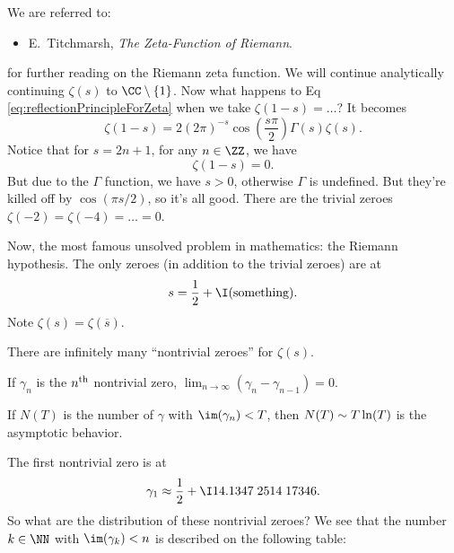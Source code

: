 
We are referred to:
\begin{itemize}
\item E.\ Titchmarsh,\newblock
\emph{The Zeta-Function of Riemann}.
\end{itemize}
for further reading on the Riemann zeta function. We will
continue analytically continuing $\zeta(s)$ to
$\CC\setminus\{1\}$. Now what happens to Eq
\eqref{eq:reflectionPrincipleForZeta} when we take
$\zeta(1-s)=\dots$?
It becomes
\begin{equation}
\zeta(1-s)=2(2\pi)^{-s}\cos\left(\frac{s\pi}{2}\right)\Gamma(s)\zeta(s).
\end{equation}
Notice that for $s=2n+1$, for any $n\in\ZZ$, we have
\begin{equation}
\zeta(1-s)=0.
\end{equation}
But due to the $\Gamma$ function, we have $s>0$, otherwise
$\Gamma$ is undefined. But they're killed off by $\cos(\pi s/2)$,
so it's all good.
There are the trivial zeroes $\zeta(-2)=\zeta(-4)=\dots=0$.

Now, the most famous unsolved problem in mathematics: the Riemann
hypothesis. The only zeroes (in addition to the trivial zeroes)
are at 
\begin{equation}
s=\frac{1}{2}+\I\mbox{(something)}.
\end{equation}
Note $\zeta(s)=\zeta(\overline{s})$.

\begin{prop}
There are infinitely many ``nontrivial zeroes'' for $\zeta(s)$.
\end{prop}
\begin{prop}
If $\gamma_{n}$ is the $n^{\rm th}$ nontrivial zero,
$\lim_{n\to\infty}(\gamma_{n}-\gamma_{n-1})=0$.
\end{prop}
\begin{con}
If $N(T)$ is the number of $\gamma$ with $\im(\gamma_{n})<T$,
then $N(T)\sim T\ln(T)$ is the asymptotic behavior.
\end{con}
The first nontrivial zero is at 
\begin{equation}
\gamma_{1}\approx\frac{1}{2}+\I14.1347\;2514\;17346.
\end{equation}
So what are the distribution of these nontrivial zeroes?
We see that the number $k\in\NN$ with $\im(\gamma_{k})<n$ is
described on the following table:

